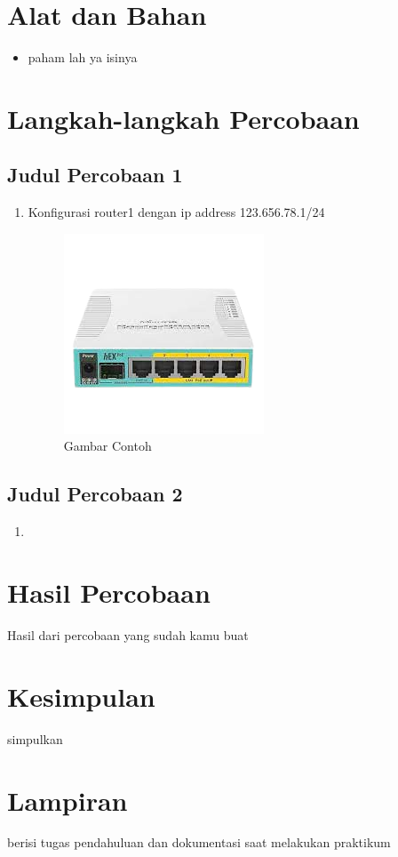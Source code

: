 \section{Alat dan Bahan}
\begin{itemize}[label=$\bullet$, itemsep=-1pt, leftmargin=*]
	\item paham lah ya isinya
\end{itemize}

\section{Langkah-langkah Percobaan}

\subsection{Judul Percobaan 1}
\begin{enumerate}
	\item Konfigurasi router1 dengan ip address 123.656.78.1/24
	\begin{figure}[H]
		\centering
		\includegraphics[width=0.5\linewidth]{P1/img/contoh.png}
		\caption{Gambar Contoh}
		\label{fig:gambar1}
	\end{figure}
\end{enumerate}

\subsection{Judul Percobaan 2}
\begin{enumerate}
	\item 
\end{enumerate}

\section{Hasil Percobaan}
Hasil dari percobaan yang sudah kamu buat

\section{Kesimpulan}
simpulkan

\section{Lampiran}
berisi tugas pendahuluan dan dokumentasi saat melakukan praktikum